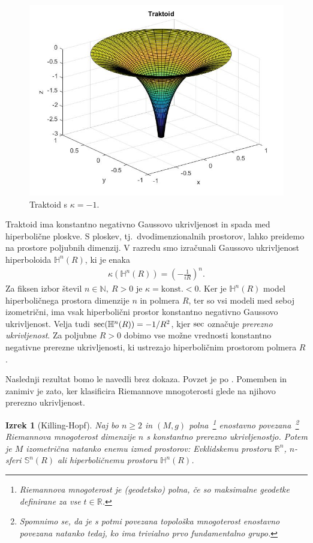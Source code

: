 \documentclass[a4paper]{article}
\newtheorem{izrek}{Izrek}
\begin{document}
\begin{figure}[h!]
\begin{center}
\includegraphics[scale=0.35]{traktoid.jpg}
\caption{Traktoid s $\kappa = -1$.}
\end{center}
\end{figure}
%
Traktoid ima konstantno negativno Gaussovo ukrivljenost in spada med hiperbolične ploskve. S ploskev, tj.~dvodimenzionalnih prostorov, lahko preidemo na prostore poljubnih dimenzij. V razredu smo izračunali Gaussovo ukrivljenost hiperboloida $\mathbb{H}^{n}(R)$, ki je enaka 
\begin{gather}
\kappa (\mathbb{H}^{n}(R)) = \left(-\frac{1}{iR} \right)^n.
\end{gather}
 Za fiksen izbor števil $n \in \mathbb{N}, \ R>0$ je $\kappa = \mbox{konst.}<0$. Ker je $\mathbb{H}^{n}(R)$ model hiperboličnega prostora dimenzije $n$ in polmera $R$, ter so vsi modeli med seboj izometrični, ima vsak hiperbolični prostor konstantno negativno Gaussovo ukrivljenost. Velja tudi $\textup{sec}(\mathbb{H}^{n}(R)) = -1/R^2$, kjer $\textup{sec}$ označuje \emph{prerezno ukrivljenost}. Za poljubne $R>0$ dobimo vse možne vrednosti konstantno negativne prerezne ukrivljenosti, ki ustrezajo hiperboličnim prostorom polmera $R$.

Naslednji rezultat bomo le navedli brez dokaza. Povzet je po \cite[Theorem 12.4 (Killing-Hopf)]{leeRM}. Pomemben in zanimiv je zato, ker klasificira Riemannove mnogoterosti glede na njihovo prerezno ukrivljenost.

\begin{izrek}[Killing-Hopf]
Naj bo $n \geq 2$ in $(M,g)$ polna~\footnote{Riemannova mnogoterost je \emph{(geodetsko) polna}, če so maksimalne geodetke definirane za vse $t \in \mathbb{R}$.} enostavno povezana~\footnote{Spomnimo se, da je s potmi povezana topološka mnogoterost \emph{enostavno povezana} natanko tedaj, ko ima trivialno prvo fundamentalno grupo.} 
Riemannova mnogoterost dimenzije $n$ s konstantno prerezno ukrivljenostjo. Potem je $M$ izometrična natanko enemu izmed prostorov: Evklidskemu prostoru $\mathbb{R}^{n}$, $n$-sferi $\mathbb{S}^{n}(R)$ ali hiperboličnemu prostoru $\mathbb{H}^{n}(R)$.
\end{izrek}
\end{document}
